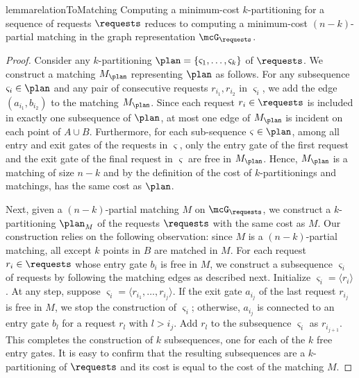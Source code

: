 \begin{restatable}{lemma}{relationToMatching}\label{lemma:relationToMatching}
    Computing a minimum-cost $k$-partitioning for a sequence of requests $\requests$ reduces to computing a minimum-cost $(n-k)$-partial matching in the graph representation $\mcG_\requests$.
\end{restatable}
\begin{proof}
Consider any $k$-partitioning $\plan=\{\varsigma_1,\ldots, \varsigma_k\}$ of $\requests$. We construct a matching $M_\plan$ representing $\plan$ as follows. For any subsequence $\varsigma_i\in \plan$ and any pair of consecutive requests $r_{i_1}, r_{i_2}$ in $\varsigma_i$, we add the edge $(a_{i_1}, b_{i_2})$ to the matching $M_\plan$. Since each request $r_i\in\requests$ is included in exactly one subsequence of $\plan$, at most one edge of $M_\plan$ is incident on each point of $A\cup B$. Furthermore, for each sub-sequence $\varsigma\in\plan$, among all entry and exit gates of the requests in $\varsigma$, only the entry gate of the first request and the exit gate of the final request in $\varsigma$ are free in $M_\plan$. Hence, $M_\plan$ is a matching of size $n-k$ and by the definition of the cost of $k$-partitionings and matchings, has the same cost as $\plan$.

Next, given a $(n-k)$-partial matching $M$ on $\mcG_\requests$, we construct a $k$-partitioning $\plan_M$ of the requests $\requests$ with the same cost as $M$. Our construction relies on the following observation: since $M$ is a $(n-k)$-partial matching, all except $k$ points in $B$ are matched in $M$. For each request $r_i\in\requests$ whose entry gate $b_i$ is free in $M$, we construct a subsequence $\varsigma_i$ of requests by following the matching edges as described next. Initialize $\varsigma_i=\langle r_i\rangle$. At any step, suppose $\varsigma_i=\langle r_{i_1}, \ldots, r_{i_j}\rangle$. If the exit gate $a_{i_j}$ of the last request $r_{i_j}$ is free in $M$, we stop the construction of $\varsigma_i$; otherwise, $a_{i_j}$ is connected to an entry gate $b_{l}$ for a request $r_{l}$ with $l>i_j$. Add $r_l$ to the subsequence $\varsigma_i$ as $r_{i_{j+1}}$. This completes the construction of $k$ subsequences, one for each of the $k$ free entry gates. It is easy to confirm that the resulting subsequences are a $k$-partitioning of $\requests$ and its cost is equal to the cost of the matching $M$.
\end{proof}


